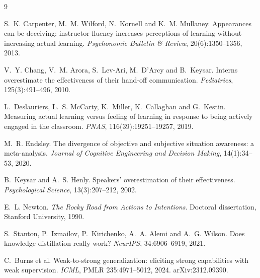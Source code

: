 \documentclass[11pt]{article}
\begin{document}
\begin{thebibliography}{9}

S.~K. Carpenter, M.~M. Wilford, N.~Kornell and K.~M. Mullaney.
\newblock Appearances can be deceiving: instructor fluency increases perceptions
of learning without increasing actual learning.
\newblock \emph{Psychonomic Bulletin \& Review}, 20(6):1350--1356, 2013.

V.~Y. Chang, V.~M. Arora, S.~Lev-Ari, M.~D'Arcy and B.~Keysar.
\newblock Interns overestimate the effectiveness of their hand-off
communication.
\newblock \emph{Pediatrics}, 125(3):491--496, 2010.

L.~Deslauriers, L.~S. McCarty, K.~Miller, K.~Callaghan and G.~Kestin.
\newblock Measuring actual learning versus feeling of learning in response to
being actively engaged in the classroom.
\newblock \emph{PNAS}, 116(39):19251--19257, 2019.

M.~R. Endsley.
\newblock The divergence of objective and subjective situation awareness: a
meta-analysis.
\newblock \emph{Journal of Cognitive Engineering and Decision Making},
14(1):34--53, 2020.

B.~Keysar and A.~S. Henly.
\newblock Speakers' overestimation of their effectiveness.
\newblock \emph{Psychological Science}, 13(3):207--212, 2002.

E.~L. Newton.
\newblock \emph{The Rocky Road from Actions to Intentions}.
\newblock Doctoral dissertation, Stanford University, 1990.

S.~Stanton, P.~Izmailov, P.~Kirichenko, A.~A. Alemi and A.~G. Wilson.
\newblock Does knowledge distillation really work?
\newblock \emph{NeurIPS}, 34:6906--6919, 2021.

C.~Burns et al.
\newblock Weak-to-strong generalization: eliciting strong capabilities with weak
supervision.
\newblock \emph{ICML}, PMLR 235:4971--5012, 2024. arXiv:2312.09390.

\end{thebibliography}
\end{document}
